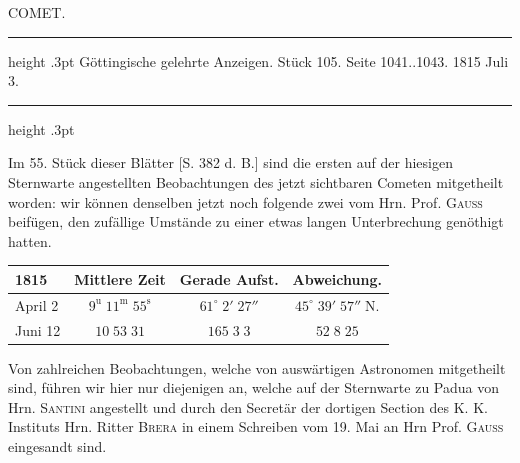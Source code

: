 \par\bigskip{}
\hypertarget{native-390-lower}{}\label{native-390-lower}
\begin{center}\large COMET.\end{center}
\begin{center}\parbox{.90\linewidth}{\centering\small\frenchspacing
\hrule height .3pt\relax\vspace{2.5pt}
Göttingische gelehrte Anzeigen. Stück 105. Seite 1041..1043. 1815 Juli 3.\par
\vspace{2.5pt}\hrule height .3pt\relax
}\end{center}

\par\indent Im 55. Stück dieser Blätter [S. 382 d. B.] sind die ersten auf der hiesigen Sternwarte
angestellten Beobachtungen des jetzt sichtbaren Cometen mitgetheilt worden: wir können denselben
jetzt noch folgende zwei vom Hrn. Prof. \textsc{Gauss} beifügen, den zufällige Umstände zu einer etwas
langen Unterbrechung genöthigt hatten.

\begin{center}\fontsize{10}{12}\selectfont\setlength{\tabcolsep}{4pt}\renewcommand{\arraystretch}{1.15}\begin{tabular}{l|c|c|c}
1815 & Mittlere Zeit & Gerade Aufst. & Abweichung.\\\hline
April 2 & $9^{\mathrm u}\;11^{\mathrm m}\;55^{\mathrm s}$ & $61^\circ\;2'\;27''$ & $45^\circ\;39'\;57''\;\mathrm{N.}$\\
Juni 12 & $10\;53\;31$ & $165\;3\;3$ & $52\;8\;25$\\
\end{tabular}\end{center}

\par\indent Von zahlreichen Beobachtungen, welche von auswärtigen Astronomen mitgetheilt sind, führen wir
hier nur diejenigen an, welche auf der Sternwarte zu Padua von Hrn. \textsc{Santini} angestellt und durch
den Secretär der dortigen Section des K. K. Instituts Hrn. Ritter \textsc{Brera} in einem Schreiben vom 19.
Mai an Hrn Prof. \textsc{Gauss} eingesandt sind.

